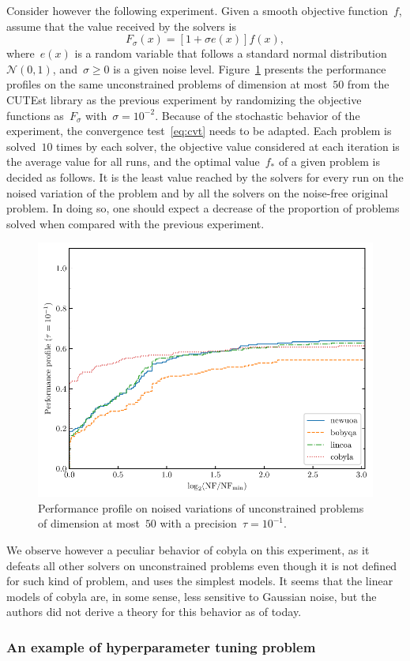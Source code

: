 \documentclass[11pt,draft]{article}
\numberwithin{equation}{section}
\def\obj{\ensuremath{f}}
\begin{document}
Consider however the following experiment.
Given a smooth objective function~$\obj$, assume that the value received by the solvers is
$$F_{\sigma}(x) = [1 + \sigma e(x)] \obj(x),$$
where~$e(x)$ is a random variable that follows a standard normal distribution~$\mathcal{N}(0, 1)$, and~$\sigma \ge 0$ is a given noise level.
Figure~\ref{fig:ppun-50} presents the performance profiles on the same unconstrained problems of dimension at most~$50$ from the CUTEst library as the previous experiment by randomizing the objective functions as~$F_{\sigma}$ with~$\sigma = 10^{-2}$.
Because of the stochastic behavior of the experiment, the convergence test~\eqref{eq:cvt} needs to be adapted.
Each problem is solved~$10$ times by each solver, the objective value considered at each iteration is the average value for all runs, and the optimal value~$f_{\ast}$ of a given problem is decided as follows.
It is the least value reached by the solvers for every run on the noised variation of the problem and by all the solvers on the noise-free original problem.
In doing so, one should expect a decrease of the proportion of problems solved when compared with the previous experiment.

\begin{figure}[ht]
    \centering
    \includegraphics[width=.48\textwidth]{pp50-noisy.pdf}
    \caption{Performance profile on noised variations of unconstrained problems of dimension at most~$50$ with a precision~$\tau = 10^{-1}$.}
    \label{fig:ppun-50}
\end{figure}

We observe however a peculiar behavior of \gls{cobyla} on this experiment, as it defeats all other solvers on unconstrained problems even though it is not defined for such kind of problem, and uses the simplest models.
It seems that the linear models of \gls{cobyla} are, in some sense, less sensitive to Gaussian noise, but the authors did not derive a theory for this behavior as of today.

\subsubsection{An example of hyperparameter tuning problem}
\end{document}
